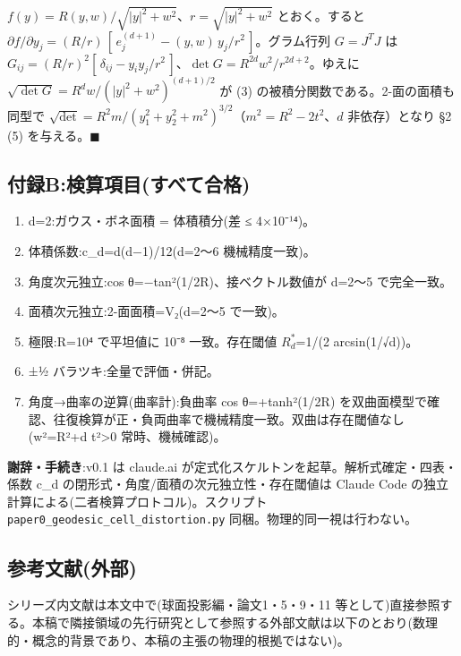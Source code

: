 \documentclass[
]{ltjsarticle}
\providecommand{\tightlist}{%
  \setlength{\itemsep}{0pt}\setlength{\parskip}{0pt}}
\begin{document}
\(f(y)=R(y,w)/\sqrt{|y|^2+w^2}\)、\(r=\sqrt{|y|^2+w^2}\) とおく。すると
\(\partial f/\partial y_j=(R/r)\,[\,e_j^{(d+1)} - (y,w)\,y_j/r^2\,]\)。グラム行列
\(G=J^{T}J\) は
\(G_{ij}=(R/r)^2[\,\delta_{ij} - y_i y_j/r^2\,]\)、\(\det G=R^{2d}w^2/r^{2d+2}\)。ゆえに
\(\sqrt{\det G}=R^{d}w/(|y|^2+w^2)^{(d+1)/2}\) が (3)
の被積分関数である。2-面の面積も同型で
\(\sqrt{\det}=R^2 m/(y_1^2+y_2^2+m^2)^{3/2}\)（\(m^2=R^2-2t^2\)、\(d\)
非依存）となり §2 (5) を与える。\(\blacksquare\)

\subsection{付録B:検算項目(すべて合格)}\label{ux4ed8ux9332bux691cux7b97ux9805ux76eeux3059ux3079ux3066ux5408ux683c}

\begin{enumerate}
\def\labelenumi{\arabic{enumi}.}
\tightlist
\item
  d=2:ガウス・ボネ面積 = 体積積分(差 ≤ 4×10⁻¹⁴)。
\item
  体積係数:c\_d=d(d−1)/12(d=2〜6 機械精度一致)。
\item
  角度次元独立:cos θ=−tan²(1/2R)、接ベクトル数値が d=2〜5 で完全一致。
\item
  面積次元独立:2-面面積=V₂(d=2〜5 で一致)。
\item
  極限:R=10⁴ で平坦値に 10⁻⁸ 一致。存在閾値 \(R^{*}_{d}\)=1/(2
  arcsin(1/√d))。
\item
  ±½ バラツキ:全量で評価・併記。
\item
  角度→曲率の逆算(曲率計):負曲率 cos θ=+tanh²(1/2R)
  を双曲面模型で確認、往復検算が正・負両曲率で機械精度一致。双曲は存在閾値なし(w²=R²+d
  t²\textgreater0 常時、機械確認)。
\end{enumerate}

\textbf{謝辞・手続き}:v0.1 は claude.ai
が定式化スケルトンを起草。解析式確定・四表・係数 c\_d
の閉形式・角度/面積の次元独立性・存在閾値は Claude Code
の独立計算による(二者検算プロトコル)。スクリプト
\texttt{paper0\_geodesic\_cell\_distortion.py}
同梱。物理的同一視は行わない。

\subsection{参考文献(外部)}\label{ux53c2ux8003ux6587ux732eux5916ux90e8}

シリーズ内文献は本文中で(球面投影編・論文1・5・9・11
等として)直接参照する。本稿で隣接領域の先行研究として参照する外部文献は以下のとおり(数理的・概念的背景であり、本稿の主張の物理的根拠ではない)。
\end{document}
